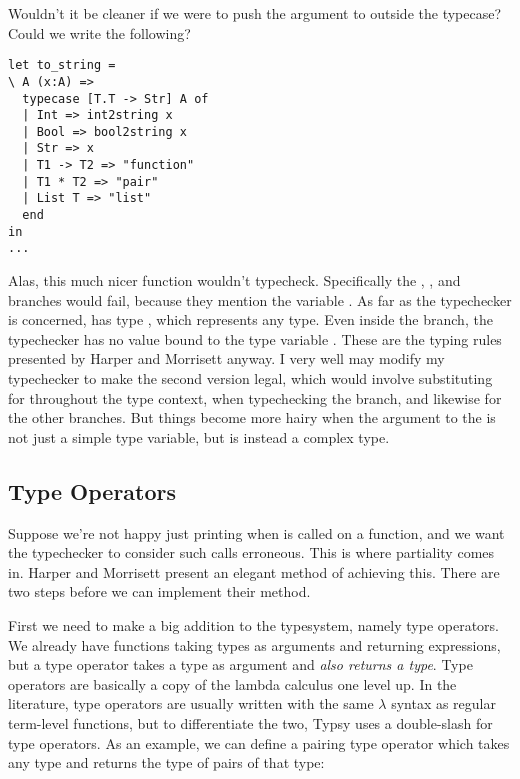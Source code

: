 \documentclass[pageno]{jpaper}
\begin{document}
{{{%

Wouldn't it be cleaner if we were to push the argument to  outside the typecase?
Could we write the following?

\begin{lstlisting}[mathescape]
let to_string = 
\ A (x:A) =>
  typecase [T.T -> Str] A of
  | Int => int2string x
  | Bool => bool2string x
  | Str => x
  | T1 -> T2 => "function"
  | T1 * T2 => "pair"
  | List T => "list"
  end
in
...
\end{lstlisting}

Alas, this much nicer function wouldn't typecheck. Specifically the , ,
and  branches would fail, because they mention the variable . As far as the typechecker is concerned,  has type , which represents any type. Even inside the  branch,
the typechecker has no value bound to the type variable . These are the typing rules presented by
Harper and Morrisett anyway. I very well may modify my typechecker to make the second version legal,
which would involve substituting  for  throughout the type context, when typechecking
the  branch, and likewise for the other branches. But things become more hairy when
the argument to the  is not just a simple type variable, but is instead a complex
type. 

\subsection{Type Operators}

Suppose we're not happy just printing  when  is called on a function,
and we want the typechecker to consider such calls erroneous.  This is where partiality comes in.
Harper and Morrisett present an elegant method of achieving this. There are two steps before
we can implement their method.

First we need to make a big addition to the typesystem, namely type operators.
We already have functions taking types as arguments and returning expressions, but a type operator takes
a type as argument and \textit{also returns a type}.
Type operators are basically a copy of the lambda calculus one level up.  In the literature, type operators are usually written with the same $\lambda$ syntax as regular term-level functions, but to differentiate the two, Typsy uses a double-slash \lsti{\\} for type operators. As an example, we can define
a pairing type operator which takes any type and returns the type of pairs of that type:

}}}
\end{document}
